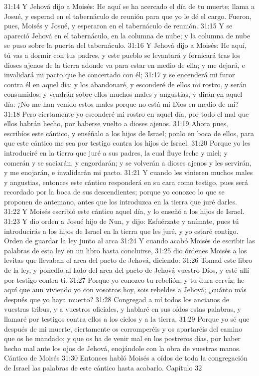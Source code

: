 31:14 Y Jehová dijo a Moisés: He aquí se ha acercado el día de tu muerte; llama a Josué, y esperad en el tabernáculo de reunión para que yo le dé el cargo. Fueron, pues, Moisés y Josué, y esperaron en el tabernáculo de reunión.  
31:15 Y se apareció Jehová en el tabernáculo, en la columna de nube; y la columna de nube se puso sobre la puerta del tabernáculo.  
31:16 Y Jehová dijo a Moisés: He aquí, tú vas a dormir con tus padres, y este pueblo se levantará y fornicará tras los dioses ajenos de la tierra adonde va para estar en medio de ella; y me dejará, e invalidará mi pacto que he concertado con él;  
31:17 y se encenderá mi furor contra él en aquel día; y los abandonaré, y esconderé de ellos mi rostro, y serán consumidos; y vendrán sobre ellos muchos males y angustias, y dirán en aquel día: ¿No me han venido estos males porque no está mi Dios en medio de mí?  
31:18 Pero ciertamente yo esconderé mi rostro en aquel día, por todo el mal que ellos habrán hecho, por haberse vuelto a dioses ajenos.  
31:19 Ahora pues, escribíos este cántico, y enséñalo a los hijos de Israel; ponlo en boca de ellos, para que este cántico me sea por testigo contra los hijos de Israel.  
31:20 Porque yo les introduciré en la tierra que juré a sus padres, la cual fluye leche y miel; y comerán y se saciarán, y engordarán; y se volverán a dioses ajenos y les servirán, y me enojarán, e invalidarán mi pacto.  
31:21 Y cuando les vinieren muchos males y angustias, entonces este cántico responderá en su cara como testigo, pues será recordado por la boca de sus descendientes; porque yo conozco lo que se proponen de antemano, antes que los introduzca en la tierra que juré darles.  
31:22 Y Moisés escribió este cántico aquel día, y lo enseñó a los hijos de Israel.  
31:23 Y dio orden a Josué hijo de Nun, y dijo: Esfuérzate y anímate, pues tú introducirás a los hijos de Israel en la tierra que les juré, y yo estaré contigo.  
Orden de guardar la ley junto al arca  
31:24 Y cuando acabó Moisés de escribir las palabras de esta ley en un libro hasta concluirse,  
31:25 dio órdenes Moisés a los levitas que llevaban el arca del pacto de Jehová, diciendo:  
31:26 Tomad este libro de la ley, y ponedlo al lado del arca del pacto de Jehová vuestro Dios, y esté allí por testigo contra ti.  
31:27 Porque yo conozco tu rebelión, y tu dura cerviz; he aquí que aun viviendo yo con vosotros hoy, sois rebeldes a Jehová; ¿cuánto más después que yo haya muerto?  
31:28 Congregad a mí todos los ancianos de vuestras tribus, y a vuestros oficiales, y hablaré en sus oídos estas palabras, y llamaré por testigos contra ellos a los cielos y a la tierra.  
31:29 Porque yo sé que después de mi muerte, ciertamente os corromperéis y os apartaréis del camino que os he mandado; y que os ha de venir mal en los postreros días, por haber hecho mal ante los ojos de Jehová, enojándole con la obra de vuestras manos.  
Cántico de Moisés  
31:30 Entonces habló Moisés a oídos de toda la congregación de Israel las palabras de este cántico hasta acabarlo.  
Capítulo 32 

